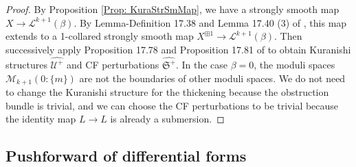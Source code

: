 \documentclass[10pt]{amsart}
\numberwithin{equation}{section}
\theoremstyle{plain}
\theoremstyle{definition}
\theoremstyle{remark}
\numberwithin{equation}{section}
\newcommand{\wh}[1]{\widehat{#1}}
\newcommand{\mf}[1]{\mathfrak{#1}}
\newcommand{\ms}[1]{\mathscr{#1}}
\begin{document}
{\begin{proof}
	By Proposition \ref{Prop: KuraStrSmMap}, we have a strongly smooth map $X\to \mathscr{L}^{k+1}(\beta)$. 
	By Lemma-Definition 17.38 and Lemma 17.40 (3) of \cite{FOOO20book}, this map extends to a 1-collared strongly smooth map $X^{\boxplus 1}\to \ms{L}^{k+1}(\beta)$. 
	Then successively apply Proposition 17.78 and Proposition 17.81 of \cite{FOOO20book} to obtain Kuranishi structures $\wh{\ms{U}^+}$ and CF perturbations $\wh{\mf{S}^+}$.  
	In the case $\beta=0$, the moduli spaces $\ms{M}_{k+1}(0:\{m\})$ are not the boundaries of other moduli spaces. We do not need to change the Kuranishi structure for the thickening because the obstruction bundle is trivial, and we can choose the CF perturbations to be trivial because the identity map $L\to L$ is already a submersion.
\end{proof}




\subsection{Pushforward of differential forms}
}
\end{document}
